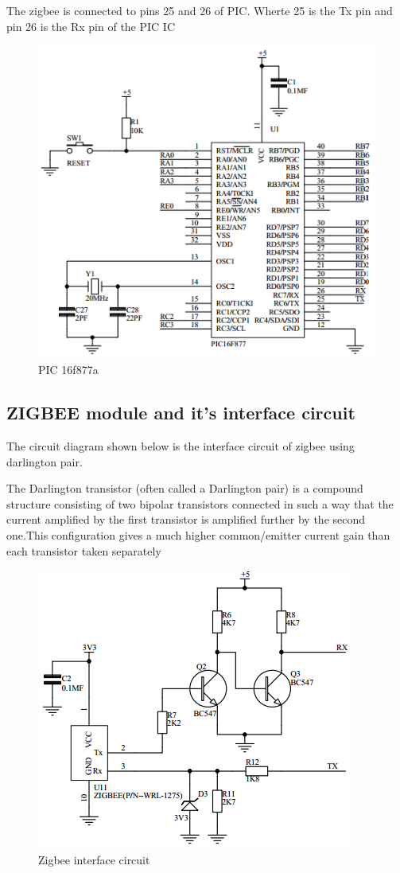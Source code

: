 \documentclass{report}
\begin{document}
The zigbee is connected to pins 25 and 26 of PIC. Wherte 25 is the Tx pin and pin 26 is the Rx pin of the PIC IC\\
\begin{figure}[h!]
\centering
\includegraphics[scale=0.8]{circpic}
\caption{PIC 16f877a}
\label{fig29}
\end{figure}
\subsection{ZIGBEE module and it's interface circuit}
The circuit diagram shown below is the interface circuit of zigbee using darlington pair.

The Darlington transistor (often called a Darlington pair) is a compound structure consisting of two bipolar transistors connected in such a way that the current amplified by the first transistor is amplified further by the second one.This configuration gives a much higher common/emitter current gain than each transistor taken separately\\
\begin{figure}[h!]
\centering
\includegraphics[scale=1]{circzigbee}
\caption{Zigbee interface circuit}
\label{fig210}
\end{figure}
\FloatBarrier
\end{document}
